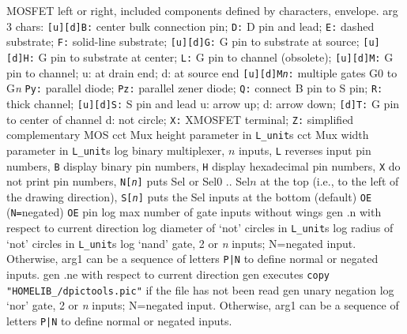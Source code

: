   {MOSFET left or right, included components defined by characters, envelope.
   arg 3 chars:
      {\tt [u][d]B:} center bulk connection pin;
      {\tt D:} D pin and lead;
      {\tt E:} dashed substrate;
      {\tt F:} solid-line substrate;
      {\tt [u][d]G:} G pin to substrate at source;
      {\tt [u][d]H:} G pin to substrate at center;
      {\tt L:} G pin to channel (obsolete);
      {\tt [u][d]M:} G pin to channel; u: at drain end; d: at source end
      {\tt [u][d]M{\sl n}:} multiple gates G0 to G{\sl n}
      {\tt Py:} parallel diode;
      {\tt Pz:} parallel zener diode;
      {\tt Q:} connect B pin to S pin;
      {\tt R:} thick channel;
      {\tt [u][d]S:} S pin and lead u: arrow up; d: arrow down;
      {\tt [d]T:} G pin to center of channel d: not circle;
      {\tt X:} XMOSFET terminal;
      {\tt Z:} simplified complementary MOS
    }
  {cct}
  {Mux height parameter in {\tt L\_unit}s}
  {cct}
  {Mux width parameter in {\tt L\_unit}s}
  {log}
  {binary multiplexer, $n$ inputs,
    {\tt L} reverses input pin numbers,
    {\tt B} display binary pin numbers,
    {\tt H} display hexadecimal pin numbers,
    {\tt X} do not print pin numbers,
    {\tt N[{\sl n}]} puts Sel or Sel$0$ .. Sel$n$ at the top
    (i.e., to the left of the drawing direction),
    {\tt S[{\sl n}]} puts the Sel inputs at the bottom (default)
    {\tt OE} ({\tt N=}negated) {\tt OE} pin
    }
  {log}
  {max number of gate inputs without wings}
  {gen}
  {.n with respect to current direction}
  {log}
  {diameter of `not' circles in {\tt L\_unit}s}
  {log}
  {radius of `not' circles in {\tt L\_unit}s}
  {log}
  {`nand' gate, 2 or {\sl n\/} inputs; N=negated input.
   Otherwise, arg1 can be a sequence of letters {\tt P|N}
   to define normal or negated inputs.
    }
  {gen}
  {.ne with respect to current direction}
  {gen}
  {executes {\tt copy "HOMELIB\_/dpictools.pic"} if the file has not been read}
  {gen}
  {unary negation}
  {log}
  {`nor' gate, 2 or {\sl n\/} inputs; N=negated input.
   Otherwise, arg1 can be a sequence of letters {\tt P|N}
   to define normal or negated inputs.
    }
